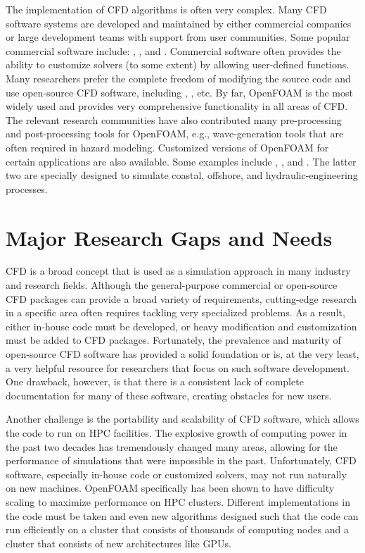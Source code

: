 The implementation of CFD algorithms is often very complex. Many CFD software systems are developed and maintained by either commercial companies or large development teams with support from user communities. Some popular commercial software include: , , and . Commercial software often provides the ability to customize solvers (to some extent) by allowing user-defined functions. Many researchers prefer the complete freedom of modifying the source code and use open-source CFD software, including , , etc. By far, OpenFOAM is the most widely used and provides very comprehensive functionality in all areas of CFD. The relevant research communities have also contributed many pre-processing and post-processing tools for OpenFOAM, e.g., wave-generation tools that are often required in hazard modeling. Customized versions of OpenFOAM for certain applications are also available. Some examples include ,  \cite{(Site needs to be updated here. This is the old site. New site is olaflow.github.io). Additional references can be Higuera2013OlaFlow, Higuera2013bOlaFlow, Higuera2014OlaFlow, Higuera2014bOlaFlow, Higuera2015OlaFlow. These five references work for both olaFlow and IHFoam}, and . The latter two are specially designed to simulate coastal, offshore, and hydraulic-engineering processes.

\section{Major Research Gaps and Needs}
\label{sec:resp_cfd_water_gaps}

CFD is a broad concept that is used as a simulation approach in many industry and research fields. Although the general-purpose commercial or open-source CFD packages can provide a broad variety of requirements, cutting-edge research in a specific area often requires tackling very specialized problems. As a result, either in-house code must be developed, or heavy modification and customization must be added to CFD packages. Fortunately, the prevalence and maturity of open-source CFD software has provided a solid foundation or is, at the very least, a very helpful resource for researchers that focus on such software development.  One drawback, however, is that there is a consistent lack of complete documentation for many of these software, creating obstacles for new users.

Another challenge is the portability and scalability of CFD software, which allows the code to run on HPC facilities. The explosive growth of computing power in the past two decades has tremendously changed many areas, allowing for the performance of simulations that were impossible in the past. Unfortunately, CFD software, especially in-house code or customized solvers, may not run naturally on new machines.  OpenFOAM specifically has been shown to have difficulty scaling to maximize performance on HPC clusters. Different implementations in the code must be taken and even new algorithms designed such that the code can run efficiently on a cluster that consists of thousands of computing nodes and a cluster that consists of new architectures like GPUs.

